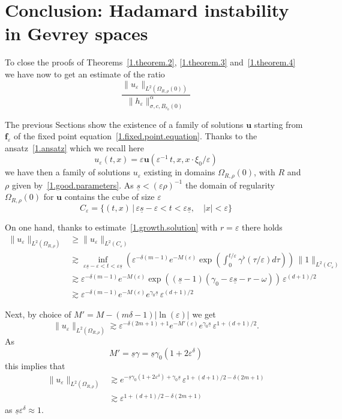 \documentclass[AHL,Unicode,longabstracts,published]{cedram}
\theoremstyle{plain}
\newcommand*\e{\varepsilon}
\newcommand{\alf}{\alpha}%
\newcommand*\g{\gamma}
\newcommand{\ubf}{{\mathbf u}}
\newcommand*\f{{\mathbf f}}
\newcommand*\dsp{\displaystyle}
\newcommand*\und{\underline}
\begin{document}
\section{Conclusion: Hadamard instability in Gevrey spaces}\label{1.section.Hadamard}

To close the proofs of Theorems~\ref{1.theorem.2}, \ref{1.theorem.3} and~\ref{1.theorem.4} we have now to get an estimate of the ratio
\[
\frac{\dsp \|u_{\e}\|_{L^2(\Omega_{R,\rho}(0))}}{\dsp \|h_{\e}\|^{\alf}_{\sigma,c,B_{r_0}(0)}}
\]


The previous Sections show the existence of a family of solutions $\ubf$ starting from $\f_{\e}$ of the fixed point equation~\eqref{1.fixed.point.equation}. Thanks to the ansatz~\eqref{1.ansatz} which we recall here
\[
u_{\e}(t,x) = \e\ubf(\e^{-1}\,t,x,x\cdot\xi_0/\e)
\]
we have then a family of solutions $u_{\e}$ existing in domains $\Omega_{R,\rho}(0)$, with $R$ and $\rho$ given by~\eqref{1.good.parameters}. As $\und{s} < (\e\rho)^{-1}$ the domain of regularity $\Omega_{R,\rho}(0)$ for $\ubf$ contains the cube of size $\e$
\[
C_{\e} = \{ (t,x) \,|\, \e\und{s} - \e < t <\e\und{s},\quad |x| < \e \}
\]


On one hand, thanks to estimate~\eqref{1.growth.solution} with $r=\e$ there holds
\begin{align*}
\|u_{\e}\|_{L^2(\Omega_{R,\rho})} & \geq \|u_{\e}\|_{L^2(C_{\e})} \\
& \gtrsim \inf_{\e\und{s} - \e < t <\e\und{s}} \left(\e^{-\delta(m-1)} e^{-M(\e)} \exp \left(\int_{0}^{t/\e} \g^{\flat}(\tau/\e) d\tau \right) \right) \,\|1\|_{L^2(C_{\e})} \\
& \gtrsim \e^{-\delta(m-1)} e^{-M(\e)} \exp \left((\und{s}-1) \left(\g_0 - \e\und{s} - r - \omega \right) \right) \, \e^{(d+1)/2} \\
& \gtrsim \e^{-\delta(m-1)} e^{-M(\e)} e^{\g_0\und{s}}\, \e^{(d+1)/2}
\end{align*}


 Next, by choice of $M' = M -(m\delta-1)|\ln(\e)|$ we get
\[
\|u_{\e}\|_{L^2(\Omega_{R,\rho})} \gtrsim \e^{-\delta(2m+1)+1} e^{-M'(\e)} e^{\g_0\und{s}} \, \e^{1+(d+1)/2}.
\]
As
\[
M' = \und{s} \g = \und{s}\g_0 (1+ 2\e^{\delta})
\]
this implies that
\begin{align*}
\|u_{\e}\|_{L^2(\Omega_{R,\rho})} & \gtrsim e^{ - \und{s}\g_0(1 + 2\e^{\delta}) + \g_0 \und{s}} \, \e^{1+(d+1)/2-\delta(2m+1)} \\
& \gtrsim \e^{1+(d+1)/2-\delta(2m+1)}
\end{align*}
as $\und{s}\e^{\delta} \approx 1$.
\end{document}
